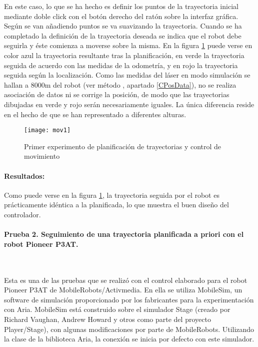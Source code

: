 \noindent
En este caso, lo que se ha hecho es definir los puntos de la trayectoria inicial mediante doble click con el botón derecho del ratón sobre la interfaz gráfica. Según se van añadiendo puntos se va suavizando la trayectoria. Cuando se ha completado la definición de la trayectoria deseada se indica que el robot debe seguirla y éste comienza a moverse sobre la misma. En la figura \ref{fg:mov1} puede verse en color azul la trayectoria resultante tras la planificación, en verde la trayectoria seguida de acuerdo con las medidas de la odometría, y en rojo la trayectoria seguida según la localización. Como las medidas del láser en modo simulación se hallan a 8000m del robot (ver método , apartado \ref{CPosData}), no se realiza asociación de datos ni se corrige la posición, de modo que las trayectorias dibujadas en verde y rojo serán necesariamente iguales. La única diferencia reside en el hecho de que se han representado a diferentes alturas.

\begin{figure}[h]
  \centering\texttt{[image: mov1]}\\
  \caption{Primer experimento de planificación de trayectorias y control de movimiento}\label{fg:mov1}
\end{figure}

\paragraph{Resultados:}
Como puede verse en la figura \ref{fg:mov1}, la trayectoria seguida por el robot es prácticamente idéntica a la planificada, lo que muestra el buen diseño del controlador.

\paragraph{Prueba 2. Seguimiento de una trayectoria planificada a priori con el robot Pioneer P3AT.}\ %

\noindent
Esta es una de las pruebas que se realizó con el control elaborado para el robot Pioneer P3AT de MobileRobots/Activmedia. En ella se utiliza MobileSim, un software de simulación proporcionado por los fabricantes para la experimentación con Aria. MobileSim está construido sobre el simulador Stage (creado por Richard Vaughan, Andrew Howard y otros como parte del proyecto Player/Stage), con algunas modificaciones por parte de MobileRobots. Utilizando la clase  de la biblioteca Aria, la conexión se inicia por defecto con este simulador.

